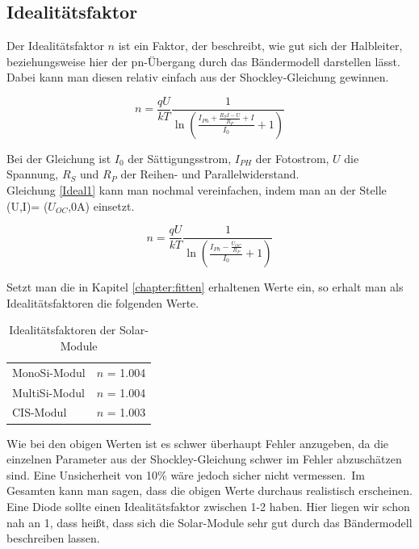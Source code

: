 \clearpage

\subsection{Idealitätsfaktor}

Der Idealitätsfaktor $n$ ist ein Faktor, der beschreibt, wie gut sich der Halbleiter, beziehungsweise hier der pn-Übergang durch das Bändermodell 
darstellen lässt. Dabei kann man diesen relativ einfach aus der Shockley-Gleichung gewinnen.

\begin{equation}
    n =  \frac{qU}{kT} \frac{1}{\ln{(\frac{I_{Ph}+\frac{R_S I -U}{R_P}+I}{I_0}+1)}}
    \label{Ideal1}
\end{equation}

Bei der Gleichung ist $I_0$ der Sättigungsstrom, $I_{PH}$ der Fotostrom, $U$ die Spannung, $R_{S}$ und $R_{P}$ der Reihen- und Parallelwiderstand.\\
Gleichung \ref{Ideal1} kann man nochmal vereinfachen, indem man an der Stelle (U,I)= ($U_{OC}$,0A) einsetzt.

\begin{equation}
    n =  \frac{qU}{kT} \frac{1}{\ln{(\frac{I_{Ph}-\frac{U_{OC}}{R_P}}{I_0}+1)}}
    \label{Ideal2}
\end{equation}

Setzt man die in Kapitel \ref{chapter:fitten} erhaltenen Werte ein, so erhalt man als Idealitätsfaktoren die folgenden Werte.

\begin{table}[h]
    \centering
    \begin{tabular}{l|r}
        MonoSi-Modul & $n$ = 1.004\\
        MultiSi-Modul & $n$ = 1.004\\
        CIS-Modul & $n$ = 1.003\\
    \end{tabular}
    \caption{Idealitätsfaktoren der Solar-Module }
\end{table}

Wie bei den obigen Werten ist es schwer überhaupt Fehler anzugeben, da die einzelnen Parameter aus der Shockley-Gleichung 
schwer im Fehler abzuschätzen sind. Eine Unsicherheit von 10\% wäre jedoch sicher nicht vermessen.\
Im Gesamten kann man sagen, dass die obigen Werte durchaus realistisch erscheinen. Eine 
Diode sollte einen Idealitätsfaktor zwischen 1-2 haben. Hier liegen wir schon nah an 1, dass 
heißt, dass sich die Solar-Module sehr gut durch das Bändermodell beschreiben lassen.


